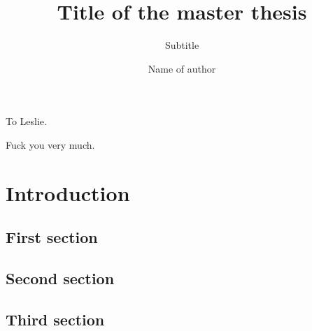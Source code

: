 \documentclass[final,11pt,baselinegrid]{../../uit-thesis}
\begin{document}

\title{Title of the master thesis}
\subtitle{Subtitle}			%
\author{Name of author}

\maketitle

\frontmatter

\begin{dedication}
To Leslie.

Fuck you very much.
\end{dedication}

\begin{epigraph}
\end{epigraph}

\begin{abstract}
\lipsum[2-3]
\end{abstract}

\begin{acknowledge}
\lipsum[4-8]
\end{acknowledge}

\tableofcontents

\listofdefinition

\mainmatter

\chapter{Introduction}
\lipsum[1]

\section{First section}
\lipsum[2-6]

\section{Second section}
\lipsum[6-7]
\newpage

\section{Third section}
\lipsum[6-8]
\end{document}
